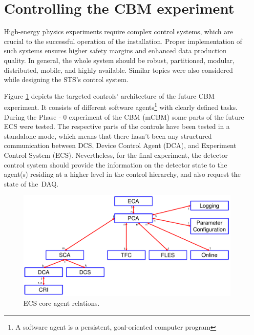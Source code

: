\section{Controlling the CBM experiment}

High-energy physics experiments require complex control systems, which are crucial to the successful operation of the installation. Proper implementation of such systems ensures higher safety margins and enhanced data production quality. In general, the whole system should be robust, partitioned, modular, distributed, mobile, and highly available. Similar topics were also considered while designing the \gls{STS}'s control system.

Figure \ref{fig_sim} depicts the targeted controls' architecture of the future \gls{CBM} experiment. It consists of different software agents\footnote{A software agent is a persistent, goal-oriented computer program} with clearly defined tasks. During the Phase - 0 experiment of the \gls{CBM} (\gls{mCBM}) some parts of the future \gls{ECS} were tested. The respective parts of the controls have been tested in a standalone mode, which means that there hasn't been any structured communication between \gls{DCS}, Device Control Agent (\gls{DCA}), and Experiment Control System (\gls{ECS}). Nevertheless, for the final experiment, the detector control system should provide the information on the detector state to the agent(s) residing at a higher level in the control hierarchy, and also request the state of the~\gls{DAQ}.

\begin{figure}[!h]
\centering
\includegraphics[width=0.8\columnwidth]{Chapter3/Controls/images/AgentsRelations_V2.pdf}
\caption{\gls{ECS} core agent relations.}
\label{fig_sim}
\end{figure}

